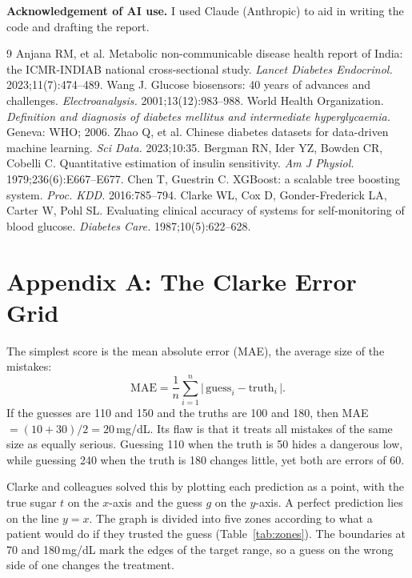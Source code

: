 \documentclass[11pt,a4paper]{article}
\begin{document}
\textbf{Acknowledgement of AI use.} I used Claude (Anthropic) to aid in writing the code and drafting the report.

\begin{thebibliography}{9}
\small
\setlength{\itemsep}{1pt}
 Anjana RM, et al. Metabolic non-communicable disease health report of India: the ICMR-INDIAB national cross-sectional study. \emph{Lancet Diabetes Endocrinol.} 2023;11(7):474--489.
 Wang J. Glucose biosensors: 40 years of advances and challenges. \emph{Electroanalysis.} 2001;13(12):983--988.
 World Health Organization. \emph{Definition and diagnosis of diabetes mellitus and intermediate hyperglycaemia.} Geneva: WHO; 2006.
 Zhao Q, et al. Chinese diabetes datasets for data-driven machine learning. \emph{Sci Data.} 2023;10:35.
 Bergman RN, Ider YZ, Bowden CR, Cobelli C. Quantitative estimation of insulin sensitivity. \emph{Am J Physiol.} 1979;236(6):E667--E677.
 Chen T, Guestrin C. XGBoost: a scalable tree boosting system. \emph{Proc. KDD.} 2016:785--794.
 Clarke WL, Cox D, Gonder-Frederick LA, Carter W, Pohl SL. Evaluating clinical accuracy of systems for self-monitoring of blood glucose. \emph{Diabetes Care.} 1987;10(5):622--628.
\end{thebibliography}

\section*{Appendix A: The Clarke Error Grid}

The simplest score is the mean absolute error (MAE), the average size of the mistakes:
\[
\text{MAE} = \frac{1}{n}\sum_{i=1}^{n}\bigl|\,\text{guess}_i - \text{truth}_i\,\bigr|.
\]
If the guesses are 110 and 150 and the truths are 100 and 180, then MAE $= (10+30)/2 = 20$\,mg/dL. Its flaw is that it treats all mistakes of the same size as equally serious. Guessing 110 when the truth is 50 hides a dangerous low, while guessing 240 when the truth is 180 changes little, yet both are errors of 60.

Clarke and colleagues \cite{clarke} solved this by plotting each prediction as a point, with the true sugar $t$ on the $x$-axis and the guess $g$ on the $y$-axis. A perfect prediction lies on the line $y = x$. The graph is divided into five zones according to what a patient would do if they trusted the guess (Table~\ref{tab:zones}). The boundaries at 70 and 180\,mg/dL mark the edges of the target range, so a guess on the wrong side of one changes the treatment.
\end{document}
